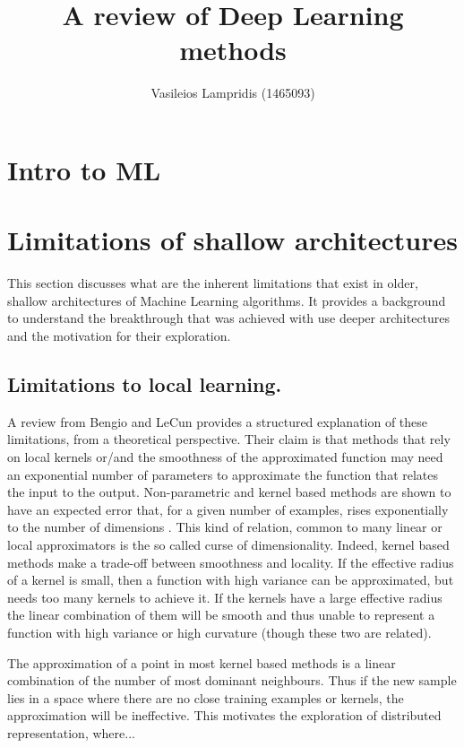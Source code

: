 \documentclass[a4paper]{report}
\author{Vasileios Lampridis	(1465093)}
\title{A review of Deep Learning methods}
\begin{document}
	
\tableofcontents
\listoffigures
\newpage

\maketitle

\begin{abstract}

\end{abstract}

\section{Intro to ML}
\section{Limitations of shallow architectures}
	This section discusses what are the inherent limitations that exist in older, shallow architectures of Machine Learning algorithms. It provides a background to understand the breakthrough that was achieved with use deeper architectures and the motivation for their exploration. 	
	\subsection{Limitations to local learning.}
		A review from Bengio and LeCun \cite{Bengio2007} provides a structured explanation of these limitations, from a theoretical perspective. Their claim is that methods that rely on local kernels or/and the smoothness of the approximated function may need an exponential number of parameters to approximate the function that relates the input to the output.
		Non-parametric and kernel based methods are shown to have an expected error that, for a given number of examples, rises exponentially to the number of dimensions \cite{Hardle2004}. This kind of relation, common to many linear or local approximators is the so called curse of dimensionality.
		Indeed, kernel based methods make a trade-off between smoothness and locality. If the effective radius of a kernel is small, then a function with high variance can be approximated, but needs too many kernels to achieve it. If the kernels have a large effective radius the linear combination of them will be smooth and thus unable to represent a function with high variance or high curvature (though these two are related).
		
		The approximation of a point in most kernel based methods is a linear combination of the number of most dominant neighbours. Thus if the new sample lies in a space where there are no close training examples or kernels, the approximation will be ineffective. This motivates the exploration of distributed representation, where...
		
\end{document}
